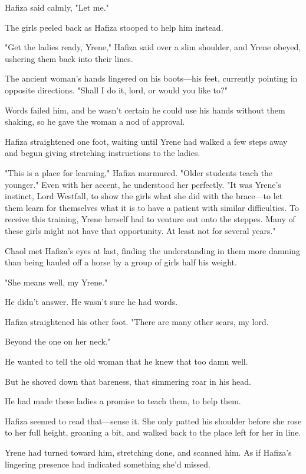 Hafiza said calmly, "Let me."

The girls peeled back as Hafiza stooped to help him instead.

"Get the ladies ready, Yrene," Hafiza said over a slim shoulder, and Yrene obeyed, ushering them back into their lines.

The ancient woman's hands lingered on his boots---his feet, currently pointing in opposite directions. "Shall I do it, lord, or would you like to?"

Words failed him, and he wasn't certain he could use his hands without them shaking, so he gave the woman a nod of approval.

Hafiza straightened one foot, waiting until Yrene had walked a few steps away and begun giving stretching instructions to the ladies.

"This is a place for learning," Hafiza murmured. "Older students teach the younger." Even with her accent, he understood her perfectly. "It was Yrene's instinct, Lord Westfall, to show the girls what she did with the brace---to let them learn for themselves what it is to have a patient with similar difficulties. To receive this training, Yrene herself had to venture out onto the steppes. Many of these girls might not have that opportunity. At least not for several years."

Chaol met Hafiza's eyes at last, finding the understanding in them more damning than being hauled off a horse by a group of girls half his weight.

"She means well, my Yrene."

He didn't answer. He wasn't sure he had words.

Hafiza straightened his other foot. "There are many other scars, my lord.

Beyond the one on her neck."

He wanted to tell the old woman that he knew that too damn well.

But he shoved down that bareness, that simmering roar in his head.

He had made these ladies a promise to teach them, to help them.

Hafiza seemed to read that---sense it. She only patted his shoulder before she rose to her full height, groaning a bit, and walked back to the place left for her in line.

Yrene had turned toward him, stretching done, and scanned him. As if Hafiza's lingering presence had indicated something she'd missed.

